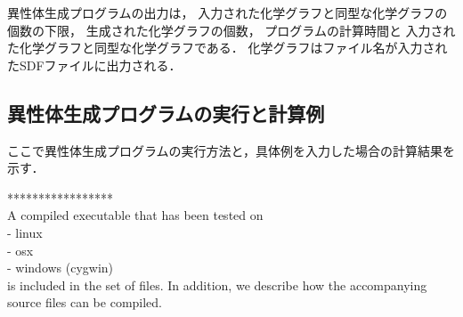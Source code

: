 \documentclass[11pt,titlepage,dvipdfmx,twoside]{jarticle}
\begin{document}
異性体生成プログラムの出力は，
入力された化学グラフと同型な化学グラフの個数の下限，
生成された化学グラフの個数，
プログラムの計算時間と
入力された化学グラフと同型な化学グラフである．
化学グラフはファイル名が入力されたSDFファイルに出力される．

\bigskip




\subsection{異性体生成プログラムの実行と計算例}
\label{sec:Example_m}

ここで異性体生成プログラムの実行方法と，具体例を入力した場合の計算結果を示す．

*****************\\
A compiled executable that has been tested on\\
- linux \\
- osx \\
- windows (cygwin) \\
is included in the set of files.
In addition, we describe how the accompanying source files can be compiled.
\end{document}
